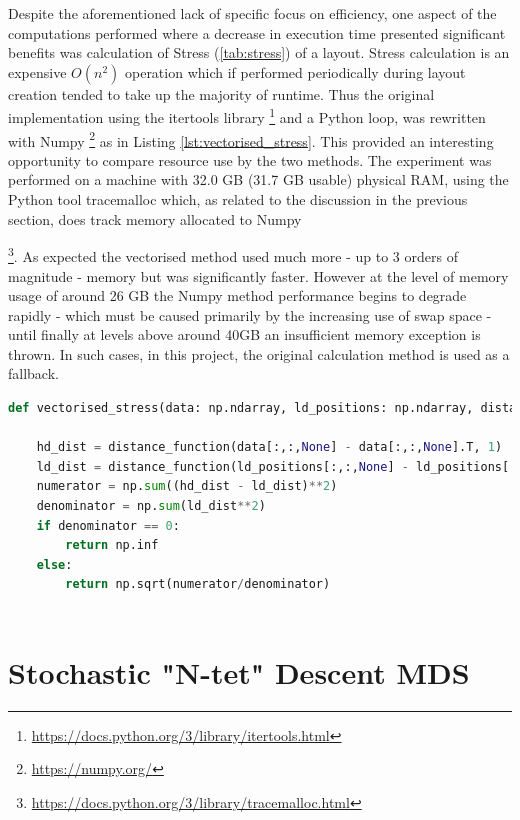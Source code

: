 \documentclass{l4proj}
\begin{document}
Despite the aforementioned lack of specific focus on efficiency, one aspect of the computations performed where a decrease in execution time presented significant benefits was calculation of Stress (\ref{tab:stress}) of a layout. Stress calculation is an expensive $O(n^2)$ operation which if performed periodically during layout creation tended to take up the majority of runtime. Thus the original implementation using the itertools library \footnote{ \url{https://docs.python.org/3/library/itertools.html}} and a Python loop, was rewritten with Numpy \footnote{ \url{https://numpy.org/}} as in Listing \ref{lst:vectorised_stress}. This provided an interesting opportunity to compare resource use by the two methods. The experiment was performed on a machine with 32.0 GB (31.7 GB usable) physical RAM, using the Python tool tracemalloc which, as related to the discussion in the previous section, does track memory allocated to Numpy {\footnote{\url{https://docs.python.org/3/library/tracemalloc.html}}. As expected the vectorised method used much more - up to 3 orders of magnitude - memory but was significantly faster. However at the level of memory usage of around 26 GB the Numpy method performance begins to degrade rapidly - which must be caused primarily by the increasing use of swap space - until finally at levels above around 40GB an insufficient memory exception is thrown. In such cases, in this project, the original calculation method is used as a fallback.

\begin{lstlisting}[language=python, float, caption={Python code to calculate vectorised Stress. A "distance\_function" retruns a norm of a numpy array (1st parameter) calculated along the specified axis (2nd parameter).}, label=lst:vectorised_stress]
def vectorised_stress(data: np.ndarray, ld_positions: np.ndarray, distance_function: Callable):
    
    hd_dist = distance_function(data[:,:,None] - data[:,:,None].T, 1)
    ld_dist = distance_function(ld_positions[:,:,None] - ld_positions[:,:,None].T, 1)
    numerator = np.sum((hd_dist - ld_dist)**2)
    denominator = np.sum(ld_dist**2)
    if denominator == 0:
        return np.inf
    else:
        return np.sqrt(numerator/denominator)
    
\end{lstlisting}

\section{Stochastic "N-tet" Descent MDS}

}
\end{document}
